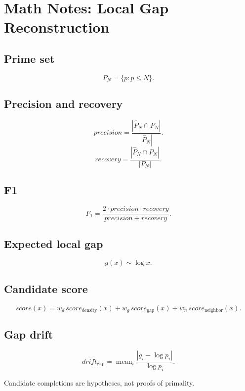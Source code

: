 \documentclass{article}
\begin{document}
\section*{Math Notes: Local Gap Reconstruction}

\subsection*{Prime set}
\[P_N=\{p:p\le N\}.\]

\subsection*{Precision and recovery}
\[precision=\frac{|\hat{P}_N\cap P_N|}{|\hat{P}_N|}.\]
\[recovery=\frac{|\hat{P}_N\cap P_N|}{|P_N|}.\]

\subsection*{F1}
\[F_1=\frac{2\cdot precision\cdot recovery}{precision+recovery}.\]

\subsection*{Expected local gap}
\[g(x)\sim \log x.\]

\subsection*{Candidate score}
\[
score(x)=w_d\,score_{\mathrm{density}}(x)+w_g\,score_{\mathrm{gap}}(x)+w_n\,score_{\mathrm{neighbor}}(x).
\]

\subsection*{Gap drift}
\[
drift_{\mathrm{gap}}=
\operatorname{mean}_i \frac{|g_i-\log p_i|}{\log p_i}.
\]

Candidate completions are hypotheses, not proofs of primality.
\end{document}
